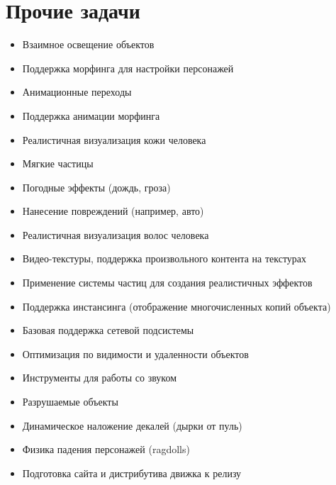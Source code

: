 \documentclass[a4paper,12pt,oneside]{sphinxmanual}
\begin{document}
\section{Прочие задачи}
\label{roadmap:id3}\begin{itemize}
\item {} 
Взаимное освещение объектов

\item {} 
Поддержка морфинга для настройки персонажей

\item {} 
Анимационные переходы

\item {} 
Поддержка анимации морфинга

\item {} 
Реалистичная визуализация кожи человека

\item {} 
Мягкие частицы

\item {} 
Погодные эффекты (дождь, гроза)

\item {} 
Нанесение повреждений (например, авто)

\item {} 
Реалистичная визуализация волос человека

\item {} 
Видео-текстуры, поддержка произвольного контента на текстурах

\item {} 
Применение системы частиц для создания реалистичных эффектов

\item {} 
Поддержка инстансинга (отображение многочисленных копий объекта)

\item {} 
Базовая поддержка сетевой подсистемы

\item {} 
Оптимизация по видимости и удаленности объектов

\item {} 
Инструменты для работы со звуком

\item {} 
Разрушаемые объекты

\item {} 
Динамическое наложение декалей (дырки от пуль)

\item {} 
Физика падения персонажей (ragdolls)

\item {} 
Подготовка сайта и дистрибутива движка к релизу


\end{itemize}
\end{document}

